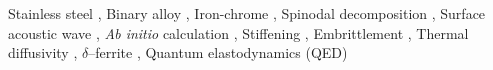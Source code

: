 \documentclass[final,3p,times]{elsarticle}
\begin{document}
\begin{frontmatter}
\begin{keyword}
Stainless steel \sep 
Binary alloy \sep
Iron-chrome \sep
Spinodal decomposition
\sep
Surface acoustic wave \sep 
\emph{Ab initio} calculation
\sep
Stiffening
\sep
Embrittlement
\sep
Thermal diffusivity
\sep
$\delta$--ferrite
\sep
Quantum elastodynamics (QED)


\end{keyword}

\end{frontmatter}











%



\end{document}
